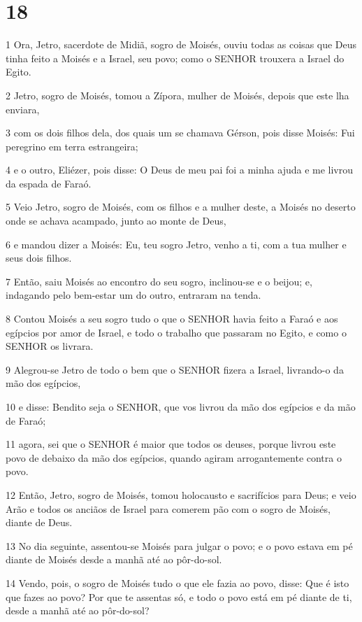 \chapter{18}

\par 1 Ora, Jetro, sacerdote de Midiã, sogro de Moisés, ouviu todas as coisas que Deus tinha feito a Moisés e a Israel, seu povo; como o SENHOR trouxera a Israel do Egito.
\par 2 Jetro, sogro de Moisés, tomou a Zípora, mulher de Moisés, depois que este lha enviara,
\par 3 com os dois filhos dela, dos quais um se chamava Gérson, pois disse Moisés: Fui peregrino em terra estrangeira;
\par 4 e o outro, Eliézer, pois disse: O Deus de meu pai foi a minha ajuda e me livrou da espada de Faraó.
\par 5 Veio Jetro, sogro de Moisés, com os filhos e a mulher deste, a Moisés no deserto onde se achava acampado, junto ao monte de Deus,
\par 6 e mandou dizer a Moisés: Eu, teu sogro Jetro, venho a ti, com a tua mulher e seus dois filhos.
\par 7 Então, saiu Moisés ao encontro do seu sogro, inclinou-se e o beijou; e, indagando pelo bem-estar um do outro, entraram na tenda.
\par 8 Contou Moisés a seu sogro tudo o que o SENHOR havia feito a Faraó e aos egípcios por amor de Israel, e todo o trabalho que passaram no Egito, e como o SENHOR os livrara.
\par 9 Alegrou-se Jetro de todo o bem que o SENHOR fizera a Israel, livrando-o da mão dos egípcios,
\par 10 e disse: Bendito seja o SENHOR, que vos livrou da mão dos egípcios e da mão de Faraó;
\par 11 agora, sei que o SENHOR é maior que todos os deuses, porque livrou este povo de debaixo da mão dos egípcios, quando agiram arrogantemente contra o povo.
\par 12 Então, Jetro, sogro de Moisés, tomou holocausto e sacrifícios para Deus; e veio Arão e todos os anciãos de Israel para comerem pão com o sogro de Moisés, diante de Deus.
\par 13 No dia seguinte, assentou-se Moisés para julgar o povo; e o povo estava em pé diante de Moisés desde a manhã até ao pôr-do-sol.
\par 14 Vendo, pois, o sogro de Moisés tudo o que ele fazia ao povo, disse: Que é isto que fazes ao povo? Por que te assentas só, e todo o povo está em pé diante de ti, desde a manhã até ao pôr-do-sol?
